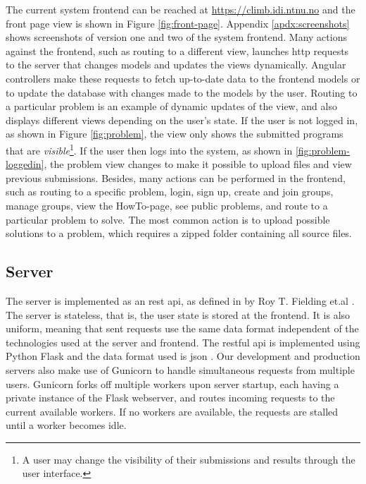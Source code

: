 The current system frontend can be reached at \url{https://climb.idi.ntnu.no} and the front page view is shown in Figure \ref{fig:front-page}. Appendix \ref{apdx:screenshots} shows screenshots of version one and two of the system frontend. Many actions against the frontend, such as routing to a different view, launches \gls{http} requests to the server that changes models and updates the views dynamically. Angular controllers make these requests to fetch up-to-date data to the frontend models or to update the database with changes made to the models by the user. Routing to a particular problem is an example of dynamic updates of the view, and also displays different views depending on the user's state. If the user is not logged in, as shown in Figure \ref{fig:problem}, the view only shows the submitted programs that are \textit{visible}\footnote{A user may change the visibility of their submissions and results through the user interface.}. If the user then logs into the system, as shown in \ref{fig:problem-loggedin}, the problem view changes to make it possible to upload files and view previous submissions. Besides, many actions can be performed in the frontend, such as routing to a specific problem, login, sign up, create and join groups, manage groups, view the HowTo-page, see public problems, and route to a particular problem to solve. The most common action is to upload possible solutions to a problem, which requires a zipped folder containing all source files. \\

\subsection{Server}
\label{subsec:cmb-arch-server}
The server is implemented as an \gls{rest} \gls{api}, as defined in by Roy T. Fielding et.al \cite{a:rtf}. The server is stateless, that is, the user state is stored at the frontend. It is also uniform, meaning that sent requests use the same data format independent of the technologies used at the server and frontend. The \gls{rest}ful \gls{api} is implemented using Python Flask \cite{FLASK} and the data format used is \gls{json} \cite{JSON}. Our development and production servers also make use of Gunicorn \cite{GUNICORN} to handle simultaneous requests from multiple users. Gunicorn forks off multiple workers upon server startup, each having a private instance of the Flask webserver, and routes incoming requests to the current available workers. If no workers are available, the requests are stalled until a worker becomes idle. \\

